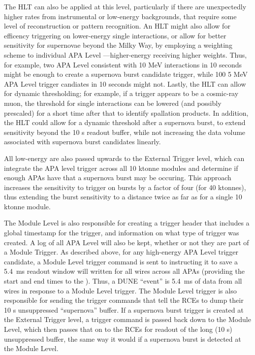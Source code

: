 	The HLT can also be applied at this level, particularly if there are
unexpectedly higher rates from instrumental or low-energy backgrounds, that
require some level of reconstruction or pattern recognition.  An HLT might also
allow for efficency triggering on lower-energy single interactions, or allow
for better sensitivity for supernovae beyond the Milky Way, by employing a
weighting scheme to individual APA Level ---higher-energy
 receiving higher weights. Thus, for example, two APA Level
 consistent with 10 MeV interactions in 10 seconds might be
enough to create a supernova burst candidate trigger, while 100 5 MeV APA Level
trigger candiates in 10 seconds might not. Lastly, the HLT can allow for
dynamic thresholding; for example, if a trigger appears to be a cosmic-ray
muon, the threshold for single interactions can be lowered (and possibly
prescaled) for a short time after that to identify spallation products. In
addition, the HLT could allow for a dynamic threshold after a supernova burst,
to extend sensitivity beyond the 10 s readout buffer, while not increasing the
data volume associated with supernova burst candidates linearly. 

All low-energy  are also passed upwards to the External
Trigger level, which can integrate the APA level trigger across all 10 ktonne
modules and determine if enough APAs have  that a supernova
burst may be occuring. This approach increases the sensitivity to trigger on
bursts by a factor of four (for 40 ktonnes), thus extending the burst
sensitivity to a distance twice as far as for a single 10 ktonne module. 

	The Module Level is also responsible for creating a trigger header that
includes a global timestamp for the trigger, and information on what type of
trigger was created. A log of all APA Level  will also be
kept, whether or not they are part of a Module Trigger. As described above, for
any high-energy APA Level trigger candidate, a Module Level trigger command is
sent  to  instructing it to save a 5.4~ms readout window will
written for all wires across all APAs (providing the start and end times to the
).  Thus, a DUNE ``event'' is 5.4~ms of data from all wires in
response to a Module Level trigger.  The Module Level trigger is also
responsible for sending the trigger commands that tell the RCEs to dump their
10 s unsuppressed ``supernova'' buffer.  If a supernova burst trigger is
created at the External Trigger level, a trigger command is passed back down to
the Module Level, which then passes that on to the RCEs for readout of the long
(10 s) unsuppressed buffer, the same way it would if a supernova burst is
detected at the Module Level. 

